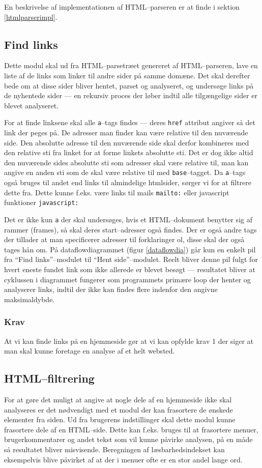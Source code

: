\documentclass[a4paper,oneside]{memoir}
\begin{document}
En beskrivelse af implementationen af HTML--parseren er at finde i
sektion \ref{htmlparserimpl}.

\subsection{Find links}
Dette modul skal ud fra HTML--parsetræet genereret af HTML--parseren,
lave en liste af de links som linker til andre sider på samme domæne.
Det skal derefter bede om at disse sider bliver hentet, parset og
analyseret, og undersøge links på de nyhentede sider --- en rekursiv
proces der løber indtil alle tilgængelige sider er blevet analyseret.

For at finde linksene skal alle \texttt{a}--tags findes --- deres
\texttt{href} attribut angiver så det link der peges på. De adresser
man finder kan være relative til den nuværende side. Den absolutte
adresse til den nuværende side skal derfor kombineres med den relative
sti fra linket for at forme linkets absolutte sti. Det er dog ikke
altid den nuværende sides absolutte sti som adresser skal være
relative til, man kan angive en anden sti som de skal være relative
til med \texttt{base}--tagget. Da \texttt{a}--tags også bruges til andet 
end links til almindelige htmlsider, sørger vi for at filtrere dette fra. 
Dette kunne f.eks. være links til mails \texttt{mailto:} eller javascript
funktioner \texttt{javascript:}

Det er ikke kun \texttt{a} der skal undersøges, hvis et HTML--dokument
benytter sig af rammer (frames), så skal deres start--adresser også
findes. Der er også andre tags der tillader at man specificerer
adresser til forklaringer ol, disse skal der også tages hån om.
\label{cyklus}
  På dataflowdiagrammet (figur \ref{dataflowdia}) går kun en enkelt pil fra
``Find links''--modulet til ``Hent side''--modulet. Reelt bliver denne pil fulgt
for hvert eneste
fundet link som ikke allerede er blevet besøgt --- resultatet bliver at
cyklussen i diagrammet fungerer som programmets primære loop der
henter og analyserer links, indtil der ikke kan findes flere indenfor
den angivne maksimaldybde.

\subsubsection{Krav}
At vi kan finde links på en hjemmeside gør at vi kan opfylde krav 1
der siger at man skal kunne foretage en analyse af et helt websted.

\subsection{HTML--filtrering}
For at gøre det muligt at angive at nogle dele af en hjemmeside ikke
skal analyseres er det nødvendigt med et modul der kan frasortere de
ønskede elementer fra siden. Ud fra brugerens indstillinger skal dette
modul kunne frasortere dele af en HTML--side. Dette kan f.eks. bruges
til at frasortere menuer, brugerkommentarer og andet tekst som vil
kunne påvirke analysen, på en måde så resultatet bliver
misvisende. Beregningen af læsbarhedsindekset kan eksempelvis blive
påvirket af at der i menuer ofte er en stor andel lange ord.
\end{document}
